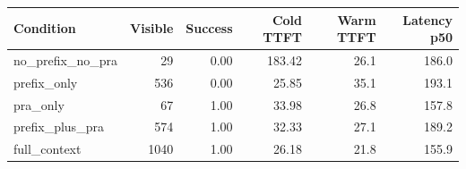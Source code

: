 \begin{tabular}{lrrrrr}\toprule
Condition & Visible & Success & Cold TTFT & Warm TTFT & Latency p50\\\midrule
no\_prefix\_no\_pra & 29 & 0.00 & 183.42 & 26.1 & 186.0 \\
prefix\_only & 536 & 0.00 & 25.85 & 35.1 & 193.1 \\
pra\_only & 67 & 1.00 & 33.98 & 26.8 & 157.8 \\
prefix\_plus\_pra & 574 & 1.00 & 32.33 & 27.1 & 189.2 \\
full\_context & 1040 & 1.00 & 26.18 & 21.8 & 155.9 \\
\bottomrule\end{tabular}
